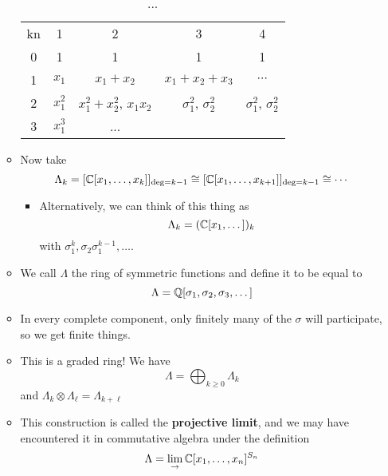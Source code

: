 \documentclass[../notes.tex]{subfiles}
\begin{document}
\begin{itemize}
\begin{itemize}
\begin{table}[h!]
\begin{tabular}{c|c|c|c|c}
                kn & 1 & 2 & 3 & 4\\
                0 & 1 & 1 & 1 & 1\\
                1 & $x_1$ & $x_1+x_2$ & $x_1+x_2+x_3$ & $\cdots$\\
                2 & $x_1^2$ & $x_1^2+x_2^2$, $x_1x_2$ & $\sigma_1^2$, $\sigma_2^2$ & $\sigma_1^2$, $\sigma_2^2$\\
                3 & $x_1^3$ & ...
            \end{tabular}
            \caption{...}
            \label{...}
        \end{table}
        \item Now take
        \begin{equation*}
            \Lambda_k = [\mathbb{C}[x_1,\dots,x_k]]_{\deg=k-1}
            \cong [\mathbb{C}[x_1,\dots,x_{k+1}]]_{\deg=k-1}
            \cong \cdots
        \end{equation*}
        \begin{itemize}
            \item Alternatively, we can think of this thing as
            \begin{equation*}
                \Lambda_k = (\mathbb{C}[x_1,\dots])_k
            \end{equation*}
            with $\sigma_1^k,\sigma_2\sigma_1^{k-1},\dots$.
        \end{itemize}
        \item We call $\Lambda$ the ring of symmetric functions and define it to be equal to
        \begin{equation*}
            \Lambda = \mathbb{Q}[\sigma_1,\sigma_2,\sigma_3,\dots]
        \end{equation*}
        \item In every complete component, only finitely many of the $\sigma$ will participate, so we get finite things.
        \item This is a graded ring! We have
        \begin{equation*}
            \Lambda = \bigoplus_{k\geq 0}\Lambda_k
        \end{equation*}
        and $\Lambda_k\otimes\Lambda_\ell=\Lambda_{k+\ell}$
        \item This construction is called the \textbf{projective limit}, and we may have encountered it in commutative algebra under the definition
        \begin{equation*}
            \Lambda = \lim_{\rightarrow}\mathbb{C}[x_1,\dots,x_n]^{S_n}
        \end{equation*}

\end{itemize}
\end{itemize}
\end{document}
